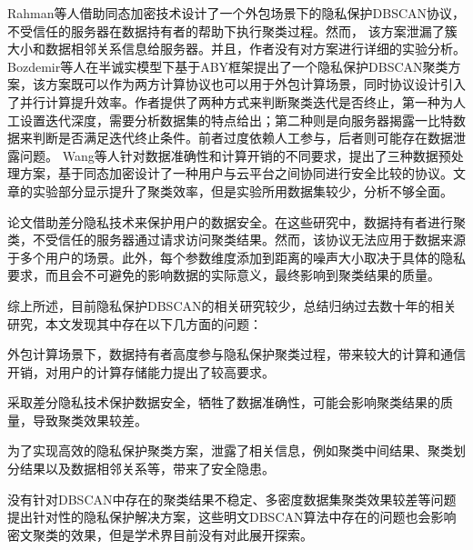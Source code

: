Rahman等人\cite{rahman2017towards}借助同态加密技术设计了一个外包场景下的隐私保护DBSCAN协议，不受信任的服务器在数据持有者的帮助下执行聚类过程。然而， 该方案泄漏了簇大小和数据相邻关系信息给服务器。并且，作者没有对方案进行详细的实验分析。
Bozdemir等人\cite{2021Privacy}在半诚实模型下基于ABY框架\cite{2015ABY}提出了一个隐私保护DBSCAN聚类方案，该方案既可以作为两方计算协议也可以用于外包计算场景，同时协议设计引入了并行计算提升效率。作者提供了两种方式来判断聚类迭代是否终止，第一种为人工设置迭代深度，需要分析数据集的特点给出；第二种则是向服务器揭露一比特数据来判断是否满足迭代终止条件。前者过度依赖人工参与，后者则可能存在数据泄露问题。
Wang等人\cite{wang2022homomorphic}针对数据准确性和计算开销的不同要求，提出了三种数据预处理方案，基于同态加密设计了一种用户与云平台之间协同进行安全比较的协议。文章的实验部分显示提升了聚类效率，但是实验所用数据集较少，分析不够全面。

论文\cite{2018DP,2015A}借助差分隐私技术来保护用户的数据安全。在这些研究中，数据持有者进行聚类，不受信任的服务器通过请求访问聚类结果。然而，该协议无法应用于数据来源于多个用户的场景。此外，每个参数维度添加到距离的噪声大小取决于具体的隐私要求，而且会不可避免的影响数据的实际意义，最终影响到聚类结果的质量。


综上所述，目前隐私保护DBSCAN的相关研究较少，总结归纳过去数十年的相关研究，本文发现其中存在以下几方面的问题：
\begin{compactitem}
	\item 外包计算场景下，数据持有者高度参与隐私保护聚类过程，带来较大的计算和通信开销，对用户的计算存储能力提出了较高要求。
	\item 采取差分隐私技术保护数据安全，牺牲了数据准确性，可能会影响聚类结果的质量，导致聚类效果较差。
	\item 为了实现高效的隐私保护聚类方案，泄露了相关信息，例如聚类中间结果、聚类划分结果以及数据相邻关系等，带来了安全隐患。
	\item 没有针对DBSCAN中存在的聚类结果不稳定、多密度数据集聚类效果较差等问题提出针对性的隐私保护解决方案，这些明文DBSCAN算法中存在的问题也会影响密文聚类的效果，但是学术界目前没有对此展开探索。
\end{compactitem}

